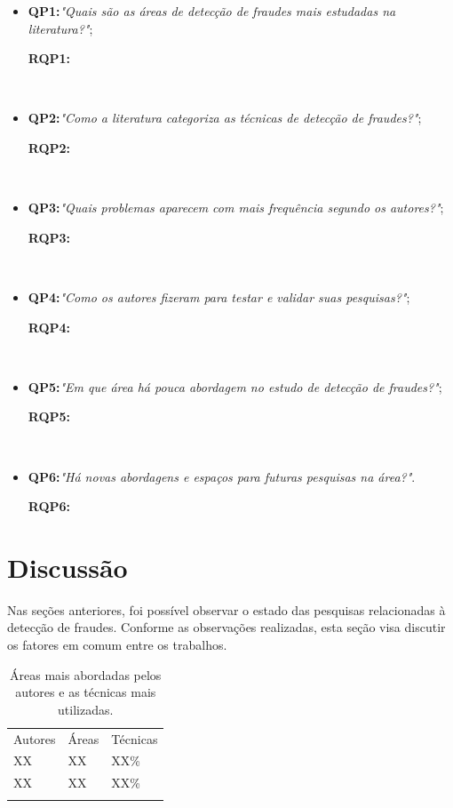 \documentclass[smallextended]{svjour3}
\begin{document}
\begin{itemize}
	\item \textbf{QP1:}\textit{"Quais são as áreas de detecção de fraudes mais estudadas na literatura?"};
	
	\textbf{RQP1:}
	
	\
	\item \textbf{QP2:}\textit{"Como a literatura categoriza as técnicas de detecção de fraudes?"};
	
	\textbf{RQP2:}
	
	\
	\item \textbf{QP3:}\textit{"Quais problemas aparecem com mais frequência segundo os autores?"};
	
	\textbf{RQP3:}
	
	\
	\item \textbf{QP4:}\textit{"Como os autores fizeram para testar e validar suas pesquisas?"};
	
	\textbf{RQP4:}
	
	\
	\item \textbf{QP5:}\textit{"Em que área há pouca abordagem no estudo de detecção de fraudes?"};
	
	\textbf{RQP5:}
	
	\
	\item \textbf{QP6:}\textit{"Há novas abordagens e espaços para futuras pesquisas na área?"}.
	
	\textbf{RQP6:}
	
\end{itemize}

\section{Discussão}
\label{sec:5}

Nas seções anteriores, foi possível observar o estado das pesquisas relacionadas à detecção de fraudes. Conforme as observações realizadas, esta seção visa discutir os fatores em comum entre os trabalhos.

\begin{table}
	\caption{Áreas mais abordadas pelos autores e as técnicas mais utilizadas.}
	\label{tab:XX}       %
	\begin{tabular}[!Ht]{lll}
		\hline\noalign{\smallskip}
		Autores & Áreas & Técnicas  \\
		\noalign{\smallskip}\hline\noalign{\smallskip}
		XX & XX & XX\% \\
		XX & XX & XX\% \\
		\noalign{\smallskip}\hline
	\end{tabular}
\end{table}
\end{document}
